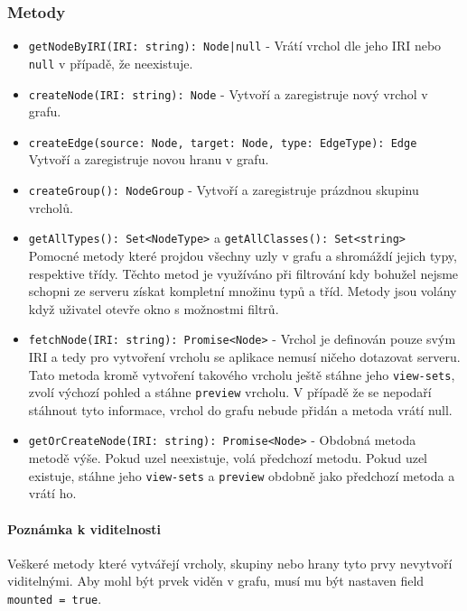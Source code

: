 \subsubsection*{Metody}
\begin{itemize}
  \item \texttt{getNodeByIRI(IRI: string): Node|null} - Vrátí vrchol dle jeho IRI nebo \texttt{null} v případě, že neexistuje.

  \item \texttt{createNode(IRI: string): Node} - Vytvoří a zaregistruje nový vrchol v grafu.
  \item \texttt{createEdge(source: Node, target: Node, type: EdgeType): Edge}\mbox{}\\Vytvoří a zaregistruje novou hranu v grafu.
  \item \texttt{createGroup(): NodeGroup} - Vytvoří a zaregistruje prázdnou skupinu vrcholů.

  \item \texttt{getAllTypes(): Set<NodeType>} a \texttt{getAllClasses(): Set<string>}\mbox{}\\Pomocné metody které projdou všechny uzly v grafu a shromáždí jejich typy, respektive třídy. Těchto metod je využíváno při filtrování kdy bohužel nejsme schopni ze serveru získat kompletní množinu typů a tříd. Metody jsou volány když uživatel otevře okno s možnostmi filtrů.

  \item \texttt{fetchNode(IRI: string): Promise<Node>} - Vrchol je definován pouze svým IRI a tedy pro vytvoření vrcholu se aplikace nemusí ničeho dotazovat serveru. Tato metoda kromě vytvoření takového vrcholu ještě stáhne jeho \texttt{view-sets}, zvolí výchozí pohled a stáhne \texttt{preview} vrcholu. V případě že se nepodaří stáhnout tyto informace, vrchol do grafu nebude přidán a metoda vrátí null.

  \item \texttt{getOrCreateNode(IRI: string): Promise<Node>} - Obdobná metoda \\metodě výše. Pokud uzel neexistuje, volá předchozí metodu. Pokud uzel existuje, stáhne jeho \texttt{view-sets} a \texttt{preview} obdobně jako předchozí metoda a vrátí ho.
\end{itemize}

\paragraph{Poznámka k viditelnosti} Veškeré metody které vytvářejí vrcholy, skupiny nebo hrany tyto prvy nevytvoří viditelnými. Aby mohl být prvek viděn v grafu, musí mu být nastaven field \texttt{mounted = true}.

